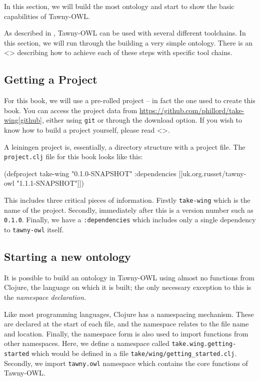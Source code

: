 \documentclass[11pt]{article}
\begin{document}
In this section, we will build the most ontology and start to show the
basic capabilities of Tawny-OWL.

As described in \label{/the/environment-the-environment}, Tawny-OWL can be
used with several different toolchains. In this section, we will run
through the building a very simple ontology. There is an <> describing
how to achieve each of these steps with specific tool chains.

\subsection{Getting a Project}
\label{sec-4-1}

For this book, we will use a pre-rolled project -- in fact the one used
to create this book. You can access the project data from
\url{https://github.com/phillord/take-wing[github}], either using \texttt{git} or
through the download option. If you wish to know how to build a project
yourself, please read <>.

A leiningen project is, essentially, a directory structure with a
project file. The \texttt{project.clj} file for this book looks like this:

\begin{tawny}
(defproject take-wing "0.1.0-SNAPSHOT"
  :dependencies [[uk.org.russet/tawny-owl "1.1.1-SNAPSHOT"]])
\end{tawny}

This includes three critical pieces of information. Firstly \texttt{take-wing}
which is the name of the project. Secondly, immediately after this is a
version number such as \texttt{0.1.0}. Finally, we have a \texttt{:dependencies} which
includes only a single dependency to \texttt{tawny-owl} itself.


\subsection{Starting a new ontology}
\label{sec-4-2}

It is possible to build an ontology in Tawny-OWL using almost no
functions from Clojure, the language on which it is built; the only
necessary exception to this is the \emph{namespace declaration}.

Like most programming languages, Clojure has a namespacing mechanism.
These are declared at the start of each file, and the namespace relates
to the file name and location. Finally, the namespace form is also used
to import functions from other namespaces. Here, we define a namespace
called \texttt{take.wing.getting-started} which would be defined in a file
\texttt{take/wing/getting\_started.clj}. Secondly, we import \texttt{tawny.owl}
namespace which contains the core functions of Tawny-OWL.
\end{document}
